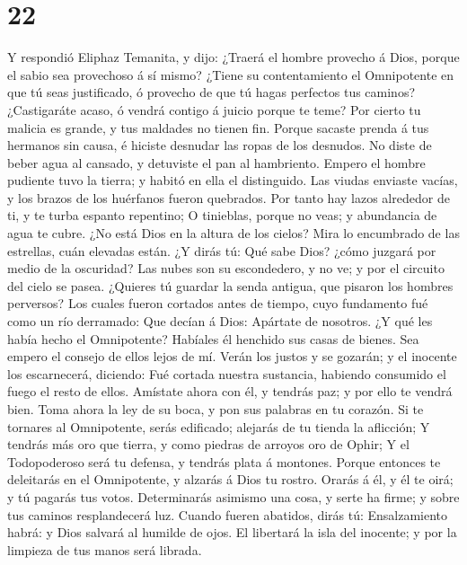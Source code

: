 \hypertarget{section-21}{%
\section{22}\label{section-21}}

 Y respondió Eliphaz Temanita, y dijo:  ¿Traerá
el hombre provecho á Dios, porque el sabio sea provechoso á sí mismo?
 ¿Tiene su contentamiento el Omnipotente en que tú seas
justificado, ó provecho de que tú hagas perfectos tus caminos?
 ¿Castigaráte acaso, ó vendrá contigo á juicio porque te
teme?  Por cierto tu malicia es grande, y tus maldades no
tienen fin.  Porque sacaste prenda á tus hermanos sin causa,
é hiciste desnudar las ropas de los desnudos.  No diste de
beber agua al cansado, y detuviste el pan al hambriento. 
Empero el hombre pudiente tuvo la tierra; y habitó en ella el
distinguido.  Las viudas enviaste vacías, y los brazos de
los huérfanos fueron quebrados.  Por tanto hay lazos
alrededor de ti, y te turba espanto repentino;  O
tinieblas, porque no veas; y abundancia de agua te cubre. 
¿No está Dios en la altura de los cielos? Mira lo encumbrado de las
estrellas, cuán elevadas están.  ¿Y dirás tú: Qué sabe
Dios? ¿cómo juzgará por medio de la oscuridad?  Las nubes
son su escondedero, y no ve; y por el circuito del cielo se pasea.
 ¿Quieres tú guardar la senda antigua, que pisaron los
hombres perversos?  Los cuales fueron cortados antes de
tiempo, cuyo fundamento fué como un río derramado:  Que
decían á Dios: Apártate de nosotros. ¿Y qué les había hecho el
Omnipotente?  Habíales él henchido sus casas de bienes. Sea
empero el consejo de ellos lejos de mí.  Verán los justos y
se gozarán; y el inocente los escarnecerá, diciendo:  Fué
cortada nuestra sustancia, habiendo consumido el fuego el resto de
ellos.  Amístate ahora con él, y tendrás paz; y por ello te
vendrá bien.  Toma ahora la ley de su boca, y pon sus
palabras en tu corazón.  Si te tornares al Omnipotente,
serás edificado; alejarás de tu tienda la aflicción;  Y
tendrás más oro que tierra, y como piedras de arroyos oro de Ophir;
 Y el Todopoderoso será tu defensa, y tendrás plata á
montones.  Porque entonces te deleitarás en el Omnipotente,
y alzarás á Dios tu rostro.  Orarás á él, y él te oirá; y
tú pagarás tus votos.  Determinarás asimismo una cosa, y
serte ha firme; y sobre tus caminos resplandecerá luz. 
Cuando fueren abatidos, dirás tú: Ensalzamiento habrá: y Dios salvará al
humilde de ojos.  El libertará la isla del inocente; y por
la limpieza de tus manos será librada.

